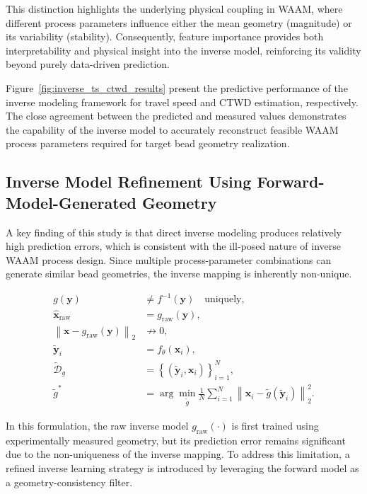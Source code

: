 \documentclass[11pt]{article}
\begin{document}
This distinction highlights the underlying physical coupling in WAAM, where different process parameters influence either the mean geometry (magnitude) or its variability (stability). Consequently, feature importance provides both interpretability and physical insight into the inverse model, reinforcing its validity beyond purely data-driven prediction.

Figure~\ref{fig:inverse_ts_ctwd_results} present the predictive performance of the inverse modeling framework for travel speed and CTWD estimation, respectively. The close agreement between the predicted and measured values demonstrates the capability of the inverse model to accurately reconstruct feasible WAAM process parameters required for target bead geometry realization.


\subsection{Inverse Model Refinement Using Forward-Model-Generated Geometry}

A key finding of this study is that direct inverse modeling produces relatively high prediction errors, which is consistent with the ill-posed nature of inverse WAAM process design. Since multiple process-parameter combinations can generate similar bead geometries, the inverse mapping is inherently non-unique.

\begin{tcolorbox}[colback=white,colframe=black,boxrule=0.5pt,arc=2pt]
\begin{equation}
\begin{aligned}
g(\mathbf{y}) &\neq f^{-1}(\mathbf{y}) \quad \text{uniquely}, \\
\hat{\mathbf{x}}_{\mathrm{raw}} &= g_{\mathrm{raw}}(\mathbf{y}), \\
\left\| \mathbf{x} - g_{\mathrm{raw}}(\mathbf{y}) \right\|_2 &\not\rightarrow 0, \\
\tilde{\mathbf{y}}_i &= f_{\theta}(\mathbf{x}_i), \\
\tilde{\mathcal{D}}_{g} &= \left\{(\tilde{\mathbf{y}}_i,\mathbf{x}_i)\right\}_{i=1}^{N}, \\
\tilde{g}^{*} &= \arg\min_{\tilde{g}} \frac{1}{N}
\sum_{i=1}^{N}
\left\| \mathbf{x}_i - \tilde{g}(\tilde{\mathbf{y}}_i) \right\|_2^2.
\end{aligned}
\end{equation}
\end{tcolorbox}

In this formulation, the raw inverse model $g_{\mathrm{raw}}(\cdot)$ is first trained using experimentally measured geometry, but its prediction error remains significant due to the non-uniqueness of the inverse mapping. To address this limitation, a refined inverse learning strategy is introduced by leveraging the forward model as a geometry-consistency filter.
\end{document}
